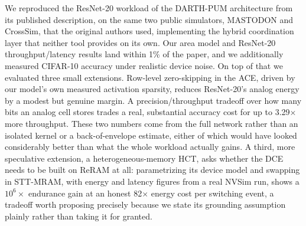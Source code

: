 \documentclass[conference]{IEEEtran}
\begin{document}
We reproduced the ResNet-20 workload of the DARTH-PUM architecture from its
published description, on the same two public simulators, MASTODON and
CrossSim, that the original authors used, implementing the hybrid
coordination layer that neither tool provides on its own. Our area model and
ResNet-20 throughput/latency results land within 1\% of the paper, and we
additionally measured CIFAR-10 accuracy under realistic device noise. On top
of that we evaluated three small extensions. Row-level zero-skipping in the
ACE, driven by our model's own measured activation sparsity, reduces
ResNet-20's analog energy by a modest but genuine margin. A
precision/throughput tradeoff over how many bits an analog cell stores
trades a real, substantial accuracy cost for up to 3.29$\times$ more
throughput. These two numbers come from the full network rather than an
isolated kernel or a back-of-envelope estimate, either of which would have
looked considerably better than what the whole workload actually gains. A
third, more speculative extension, a heterogeneous-memory HCT, asks whether
the DCE needs to be built on ReRAM at all: parametrizing its device model and
swapping in STT-MRAM, with energy and latency figures from a real NVSim run,
shows a $10^6\times$
endurance gain at an honest 82$\times$ energy cost per switching event, a
tradeoff worth proposing precisely because we state its grounding assumption
plainly rather than taking it for granted.
\end{document}
